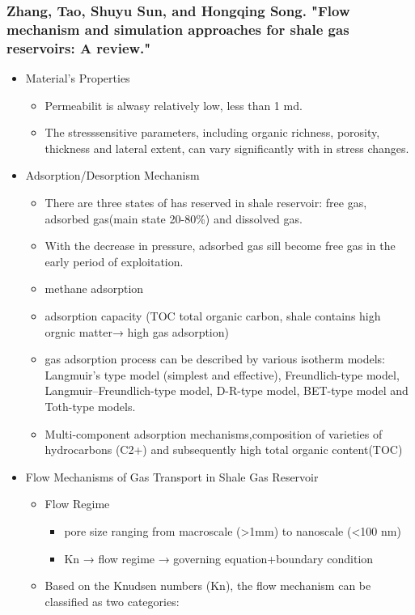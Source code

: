 \subsubsection{Zhang, Tao, Shuyu Sun, and Hongqing Song. "Flow mechanism and simulation approaches for shale gas reservoirs: A review."  \citep{zhang2019flow}}
\begin{itemize}
\item Material’s Properties
\begin{itemize}
\item Permeabilit is alwasy relatively low, less than 1 md.
\item The stresssensitive parameters, including organic richness, porosity, thickness and lateral extent, can vary significantly with in stress changes.
\end{itemize}
\item Adsorption/Desorption Mechanism
\begin{itemize}
\item There are three states of has reserved in shale reservoir: free gas, adsorbed gas(main state 20-80\%) and dissolved gas.
\item With the decrease in pressure, adsorbed gas sill become free gas in the early period of exploitation.
\item methane adsorption
\item adsorption capacity (TOC total organic carbon, shale contains high orgnic matter→ high gas adsorption)
\item gas adsorption process can be described by various isotherm models: Langmuir’s type model (simplest and effective), Freundlich-type model, Langmuir–Freundlich-type model, D-R-type model, BET-type model and Toth-type models.
\item Multi-component adsorption mechanisms,composition of varieties of hydrocarbons (C2+) and subsequently high total organic content(TOC)
\end{itemize}
\item Flow Mechanisms of Gas Transport in Shale Gas Reservoir
\begin{itemize}
\item Flow Regime
\begin{itemize}
\item pore size ranging from macroscale (>1mm) to nanoscale (<100 nm)
\item Kn → flow regime → governing equation+boundary condition
\end{itemize}
\item  Based on the Knudsen numbers (Kn), the flow mechanism can be classified as two categories:

\end{itemize}
\end{itemize}
